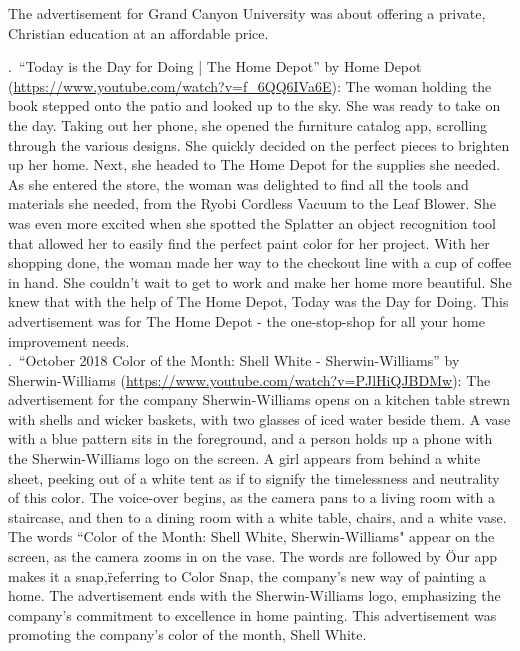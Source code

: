 \documentclass[hidelinks,11pt,a4paper]{report}
\begin{document}
    The advertisement for Grand Canyon University was about offering a private, Christian education at an affordable price.


    .~``Today is the Day for Doing | The Home Depot'' by Home Depot (\url{https://www.youtube.com/watch?v=f_6QQ6IVa6E}): The woman holding the book stepped onto the patio and looked up to the sky. She was ready to take on the day. Taking out her phone, she opened the furniture catalog app, scrolling through the various designs. She quickly decided on the perfect pieces to brighten up her home. Next, she headed to The Home Depot for the supplies she needed. As she entered the store, the woman was delighted to find all the tools and materials she needed, from the Ryobi Cordless Vacuum to the Leaf Blower. She was even more excited when she spotted the Splatter an object recognition tool that allowed her to easily find the perfect paint color for her project. With her shopping done, the woman made her way to the checkout line with a cup of coffee in hand. She couldn't wait to get to work and make her home more beautiful. She knew that with the help of The Home Depot, Today was the Day for Doing. This advertisement was for The Home Depot - the one-stop-shop for all your home improvement needs. \\


    

    .~``October 2018 Color of the Month: Shell White - Sherwin-Williams'' by Sherwin-Williams (\url{https://www.youtube.com/watch?v=PJlHiQJBDMw}): The advertisement for the company Sherwin-Williams opens on a kitchen table strewn with shells and wicker baskets, with two glasses of iced water beside them. A vase with a blue pattern sits in the foreground, and a person holds up a phone with the Sherwin-Williams logo on the screen. A girl appears from behind a white sheet, peeking out of a white tent as if to signify the timelessness and neutrality of this color. The voice-over begins, as the camera pans to a living room with a staircase, and then to a dining room with a white table, chairs, and a white vase. The words ``Color of the Month: Shell White, Sherwin-Williams" appear on the screen, as the camera zooms in on the vase. The words are followed by \"Our app makes it a snap,\" referring to Color Snap, the company's new way of painting a home. The advertisement ends with the Sherwin-Williams logo, emphasizing the company's commitment to excellence in home painting. This advertisement was promoting the company's color of the month, Shell White. \\
\end{document}

